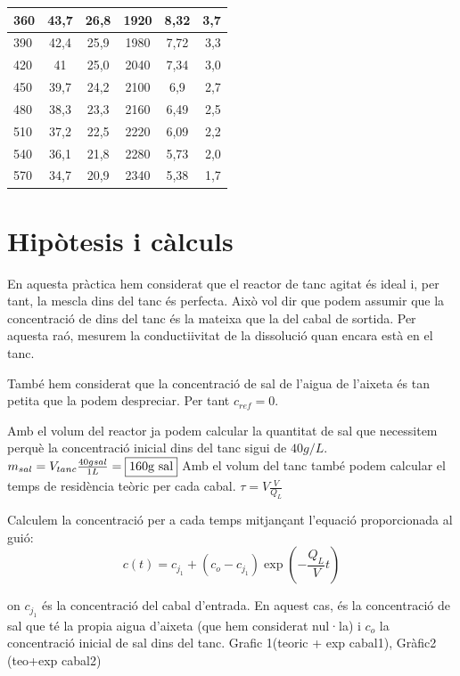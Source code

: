 \documentclass[10pt, twoside]{article}
\begin{document}
\begin{minipage}{\textwidth}
\begin{tabular}{|l|c|c|c|c|r|}
        360	&	43,7	&	26,8	&	1920	&	8,32	&	3,7	\\ \hline
        390	&	42,4	&	25,9	&	1980	&	7,72	&	3,3	\\ \hline
        420	&	41	&	25,0	&	2040	&	7,34	&	3,0	\\ \hline
        450	&	39,7	&	24,2	&	2100	&	6,9	&	2,7	\\ \hline
        480	&	38,3	&	23,3	&	2160	&	6,49	&	2,5	\\ \hline
        510	&	37,2	&	22,5	&	2220	&	6,09	&	2,2	\\ \hline
        540	&	36,1	&	21,8	&	2280	&	5,73	&	2,0	\\ \hline
        570	&	34,7	&	20,9	&	2340	&	5,38	&	1,7	\\ \hline
    \end{tabular}
\end{minipage}

\section{Hipòtesis i càlculs}

En aquesta pràctica hem considerat que el reactor de tanc agitat és ideal i, per tant, la mescla dins del tanc és perfecta. Això vol dir que podem assumir que la concentració de dins del tanc és la mateixa que la del cabal de sortida. Per aquesta raó, mesurem la conductiivitat de la dissolució quan encara està en el tanc.

També hem considerat que la concentració de sal de l'aigua de l'aixeta és tan petita que la podem despreciar. Per tant $c_{ref} = 0$.

Amb el volum del reactor ja podem calcular la quantitat de sal que necessitem perquè la concentració inicial dins del tanc sigui de $40g/L$. 
    $m_{sal} = V_{tanc}\frac{40g sal}{1L} = \fbox{160g sal}$
Amb el volum del tanc també podem calcular el temps de residència teòric per cada cabal.
    $\tau = V\frac{V}{Q_L}$

Calculem la concentració per a cada temps mitjançant l'equació proporcionada al guió:
\begin{equation}
    c(t) = c_{j_1} + (c_o-c_{j_1})\exp\left(-\frac{Q_L}{V}t\right) 
    \label{c(t)}   
\end{equation}

on $c_{j_1}$ és la concentració del cabal d'entrada. En aquest cas, és la concentració de sal que té la propia aigua d'aixeta (que hem considerat nul·la) i $c_o$ la concentració inicial de sal dins del tanc.
Grafic 1(teoric + exp cabal1), Gràfic2 (teo+exp cabal2)
\end{document}
